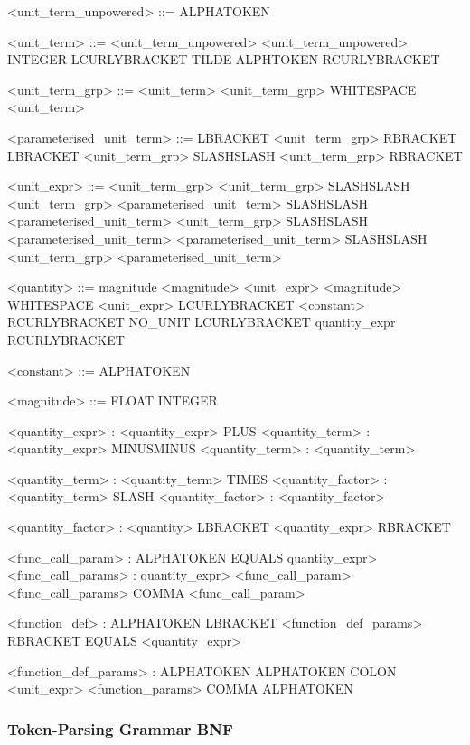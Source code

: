 \documentclass{article}
\begin{document}
{\scriptsize
\begin{grammar}

<unit\_term\_unpowered> ::= ALPHATOKEN

<unit\_term> ::= <unit\_term\_unpowered>
\alt <unit\_term\_unpowered> INTEGER
\alt LCURLYBRACKET TILDE ALPHTOKEN RCURLYBRACKET

<unit\_term\_grp> ::= <unit\_term>
\alt <unit\_term\_grp> WHITESPACE <unit\_term>

<parameterised\_unit\_term> ::= LBRACKET <unit\_term\_grp> RBRACKET
\alt LBRACKET <unit\_term\_grp> SLASHSLASH <unit\_term\_grp> RBRACKET


<unit\_expr> ::= <unit\_term\_grp>
\alt <unit\_term\_grp> SLASHSLASH <unit\_term\_grp>
\alt <parameterised\_unit\_term> SLASHSLASH <parameterised\_unit\_term>
\alt <unit\_term\_grp> SLASHSLASH <parameterised\_unit\_term>
\alt <parameterised\_unit\_term> SLASHSLASH <unit\_term\_grp>
\alt <parameterised\_unit\_term>


<quantity> ::= magnitude
\alt <magnitude> <unit\_expr>
\alt <magnitude> WHITESPACE <unit\_expr>
\alt LCURLYBRACKET <constant> RCURLYBRACKET 
\alt NO\_UNIT LCURLYBRACKET quantity\_expr RCURLYBRACKET 

<constant> ::= ALPHATOKEN 

<magnitude> ::= FLOAT 
\alt INTEGER

<quantity\_expr> : <quantity\_expr> PLUS <quantity\_term>
\alt : <quantity\_expr> MINUSMINUS <quantity\_term>
\alt : <quantity\_term>

<quantity\_term> :  <quantity\_term> TIMES <quantity\_factor>
\alt : <quantity\_term> SLASH <quantity\_factor>
\alt : <quantity\_factor>

<quantity\_factor> : <quantity> 
\alt LBRACKET <quantity\_expr> RBRACKET 

<func\_call\_param> : ALPHATOKEN EQUALS quantity\_expr>
<func\_call\_params> : quantity\_expr>
\alt <func\_call\_param> 
\alt <func\_call\_params> COMMA <func\_call\_param>

<function\_def> : ALPHATOKEN LBRACKET <function\_def\_params> RBRACKET EQUALS <quantity\_expr>

<function\_def\_params> : ALPHATOKEN
\alt ALPHATOKEN COLON <unit\_expr>
\alt <function\_params> COMMA ALPHATOKEN

\end{grammar}
}


\newpage
\subsubsection{Token-Parsing Grammar BNF}
\end{document}
